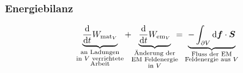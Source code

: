 \subsubsection{Energiebilanz}

\begin{equation*}
\ub{\prd{}{t} W_{\tx{mat} _V}}_{\mathclap{\substack{\tx{an Ladungen} \\ \tx{in } V \tx{ verrichtete} \\ \tx{Arbeit}}}} \ \ + \ \ \ub{\prd{}{t} W_{\tx{em}_V}}_{\mathclap{\substack{\tx{Änderung der} \\ \tx{EM Feldenergie} \\ \tx{in } V}}} \ = \ \ub{- \int_{\partial V} \dd \vec{f} \cdot \vec{S}}_{\mathclap{\substack{\tx{Fluss der EM} \\ \tx{Feldenergie aus } V}}}
\end{equation*}
%
%
%

\pagebreak

